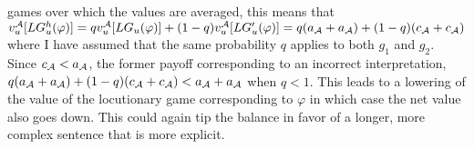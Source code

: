 games over which the values are averaged, this means that $v_u^{\cal A}[LG^{h}_u(\varphi)] = qv_u^{\cal A}[LG_u(\varphi)] + (1 - q)v_u^{\cal A}[LG'_u(\varphi)] = q(a_{\cal A} + a_{\cal A}) + (1 - q)(c_{\cal A} + c_{\cal A})$ where I have assumed that the same probability $q$ applies to both $g_1$ and $g_2$. Since $c_{\cal A} < a_{\cal A}$, the former payoff corresponding to an incorrect interpretation, $q(a_{\cal A} + a_{\cal A}) + (1 - q)(c_{\cal A} + c_{\cal A}) < a_{\cal A} + a_{\cal A}$ when $q < 1$. This leads to a lowering of the value of the locutionary game corresponding to $\varphi$ in which case the net value also goes down. This could again tip the balance in favor of a longer, more complex sentence that is more explicit.




